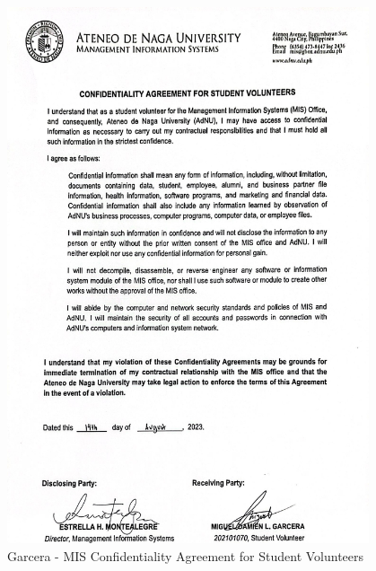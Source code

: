 \begin{figure}[H]
    \centering
    \includegraphics[width=0.95\textwidth]{figures/images/nda/mis-nda-garcera.JPG}
    \caption{Garcera - MIS Confidentiality Agreement for Student Volunteers}
    \label{fig:mis-nda-garcera}
\end{figure}

